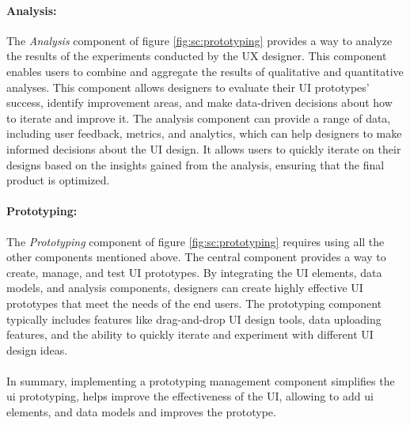 \paragraph{Analysis:}
The \textit{Analysis} component of figure \ref{fig:sc:prototyping} provides a way to analyze the results of the experiments conducted by the UX designer. 
This component enables users to combine and aggregate the results of qualitative and quantitative analyses.
This component allows designers to evaluate their UI prototypes' success, identify improvement areas, and make data-driven decisions about how to iterate and improve it. 
The analysis component can provide a range of data, including user feedback, metrics, and analytics, which can help designers to make informed decisions about the UI design.
It allows users to quickly iterate on their designs based on the insights gained from the analysis, ensuring that the final product is optimized.

\paragraph{Prototyping:}
The \textit{Prototyping} component of figure \ref{fig:sc:prototyping} requires using all the other components mentioned above. 
The central component provides a way to create, manage, and test UI prototypes. 
By integrating the UI elements, data models, and analysis components, designers can create highly effective UI prototypes that meet the needs of the end users. 
The prototyping component typically includes features like drag-and-drop UI design tools, data uploading features, and the ability to quickly iterate and experiment with different UI design ideas.\\\\
In summary, implementing a prototyping management component simplifies the \ac{ui} prototyping, helps improve the effectiveness of the UI, allowing to add \ac{ui} elements, and data models and improves the prototype.

